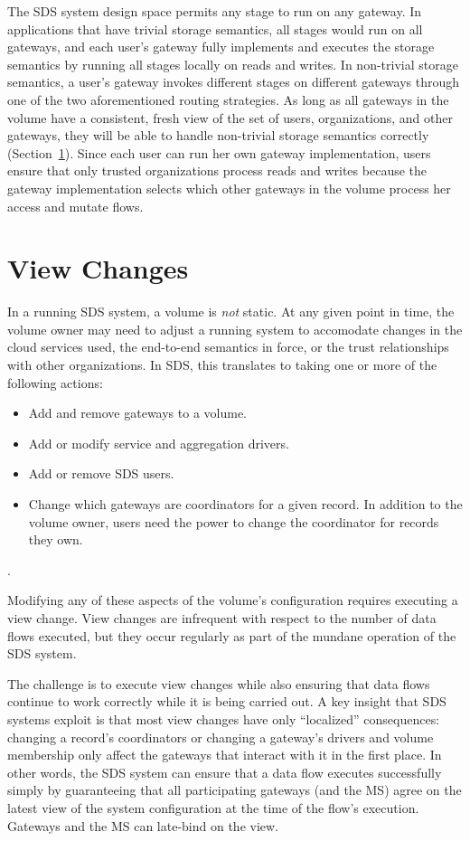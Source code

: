 The SDS system design space permits any stage to run on any gateway.  In
applications that have trivial storage semantics, all stages would run on all
gateways, and each user's gateway fully implements and executes the storage semantics
by running all stages locally on reads and writes.
In non-trivial storage semantics, a user's gateway invokes different stages on
different gateways through one of the two aforementioned routing strategies.
As long as all gateways in the volume have a consistent, fresh view of the set
of users, organizations, and other gateways, they will be able to handle
non-trivial storage semantics correctly (Section~\ref{sec:view-changes}).
Since each user can run her own gateway implementation, users ensure that
only trusted organizations process reads and writes because the gateway
implementation selects which other gateways in the volume process her access and
mutate flows.

\section{View Changes}
\label{sec:view-changes}

In a running SDS system, a volume is \emph{not} static.  At any given point in
time, the volume owner may need to adjust a running system to accomodate changes
in the cloud services used, the end-to-end semantics in force, or the trust
relationships with other organizations.  In SDS, this translates
to taking one or more of the following actions:

\begin{itemize}
   \item Add and remove gateways to a volume.
   \item Add or modify service and aggregation drivers.
   \item Add or remove SDS users.
   \item Change which gateways are coordinators for a given record.  In addition
      to the volume owner, users need the power to change the coordinator for
      records they own.
\end{itemize}.

Modifying any of these aspects of the volume's configuration requires executing a
view change.  View changes are infrequent with respect to the number of data
flows executed, but they occur regularly as part of the mundane
operation of the SDS system.

The challenge is to execute view changes while also ensuring that data flows
continue to work correctly while it is being carried out.
A key insight that SDS systems exploit is that most view changes have only
``localized'' consequences:  changing a record's coordinators or changing
a gateway's drivers and volume membership only affect the gateways that interact
with it in the first place.  In other words, the SDS system can ensure that a
data flow executes successfully simply by guaranteeing that all participating
gateways (and the MS) agree on the latest view of the system configuration at the
time of the flow's execution.  Gateways and the MS can late-bind on the view.

